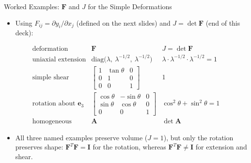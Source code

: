 \documentclass[aspectratio=169,11pt]{beamer}
\begin{document}
\begin{frame}{Worked Examples: $\mathbf{F}$ and $J$ for the Simple Deformations}
  \begin{itemize}
    \item Using $F_{ij} = \partial y_i/\partial x_j$ (defined on the next slides) and $J=\det\mathbf{F}$ (end of this deck):
  \end{itemize}
  \[
  \renewcommand{\arraystretch}{1.15}
  \begin{array}{lcc}
  \text{deformation} & \mathbf{F} & J=\det\mathbf{F}\\ \hline
  \text{uniaxial extension} & \mathrm{diag}\big(\lambda,\ \lambda^{-1/2},\ \lambda^{-1/2}\big) & \lambda\cdot\lambda^{-1/2}\cdot\lambda^{-1/2} = 1\\[3pt]
  \text{simple shear} & \begin{bmatrix}1&\tan\theta&0\\0&1&0\\0&0&1\end{bmatrix} & 1\\[14pt]
  \text{rotation about } \mathbf{e}_3 & \begin{bmatrix}\cos\theta&-\sin\theta&0\\ \sin\theta&\cos\theta&0\\0&0&1\end{bmatrix} & \cos^2\theta+\sin^2\theta = 1\\[14pt]
  \text{homogeneous} & \mathbf{A} & \det\mathbf{A}
  \end{array}
  \]
  \begin{itemize}
    \item All three named examples preserve volume ($J=1$), but only the rotation preserves shape: $\mathbf{F}^T\mathbf{F}=\mathbf{I}$ for the rotation, whereas $\mathbf{F}^T\mathbf{F}\neq\mathbf{I}$ for extension and shear.
  \end{itemize}
\end{frame}
\end{document}

